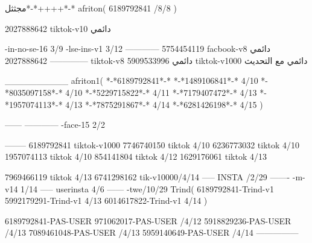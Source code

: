 مجثثل*-*++++*-*
afriton(
6189792841 /8/8
)

2027888642 tiktok-v10
دائمي

-in-no-se-16 3/9
-lse-ins-v1 3/12
------------
5754454119 facbook-v8
دائمي
--------------
2027888642 tiktok-v8
دائمي
5909533996 tiktok-v1000
دائمي مع التحديث

__________
afriton1(
*-*6189792841*-*
*-*1489106841*-* 4/10
*-*8035097158*-* 4/10
*-*5229715822*-* 4/11
*-*7179407472*-* 4/13
*-*1957074113*-* 4/13
*-*7875291867*-* 4/14
*-*6281426198*-* 4/15
)


------
------------
-face-15 2/2

--------
6189792841 tiktok-v1000
7746740150 tiktok 4/10
6236773032 tiktok 4/10
1957074113 tiktok 4/10
854141804 tiktok 4/12
1629176061 tiktok 4/13

7969466119 tiktok 4/13
6741298162 tik-v10000/4/14
-----
 INSTA /2/29
-------
-m-v14 1/14
-----
userinsta 4/6
------
-twe/10/29
Trind(
6189792841-Trind-v1 
5992179291-Trind-v1  4/13
6014617822-Trind-v1  4/14
)

6189792841-PAS-USER
971062017-PAS-USER /4/12
5918829236-PAS-USER /4/13
7089461048-PAS-USER /4/13
5959140649-PAS-USER /4/14
    ---------------
